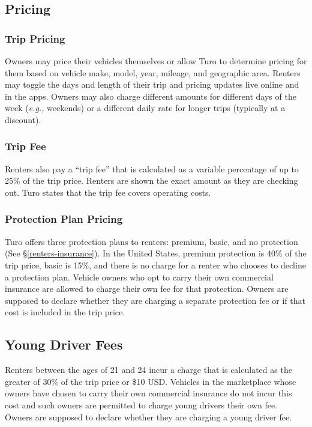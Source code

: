 \documentclass[review,12pt]{elsarticle}
\begin{document}
  \subsection{Pricing}
    \subsubsection{Trip Pricing}
    Owners may price their vehicles themselves or allow Turo to determine pricing for them based on vehicle make, model, year, mileage, and geographic area. Renters may toggle the days and length of their trip and pricing updates live online and in the apps. Owners may also charge different amounts for different days of the week (\emph{e.g.,} weekends) or a different daily rate for longer trips (typically at a discount).
    \subsubsection{Trip Fee}
    Renters also pay a ``trip fee'' that is calculated as a variable percentage of up to 25\% of the trip price. Renters are shown the exact amount as they are checking out. Turo states that the trip fee covers operating costs.
    \subsubsection{Protection Plan Pricing}
    Turo offers three protection plans to renters: premium, basic, and no protection (See \S\ref{renters-insurance}). In the United States, premium protection is 40\% of the trip price, basic is 15\%, and there is no charge for a renter who chooses to decline a protection plan. Vehicle owners who opt to carry their own commercial insurance are allowed to charge their own fee for that protection. Owners are supposed to declare whether they are charging a separate protection fee or if that cost is included in the trip price.

  \subsection{Young Driver Fees}
  Renters between the ages of 21 and 24 incur a charge that is calculated as the greater of 30\% of the trip price or \$10 USD. Vehicles in the marketplace whose owners have chosen to carry their own commercial insurance do not incur this cost and such owners are permitted to charge young drivers their own fee. Owners are supposed to declare whether they are charging a young driver fee.
\end{document}

